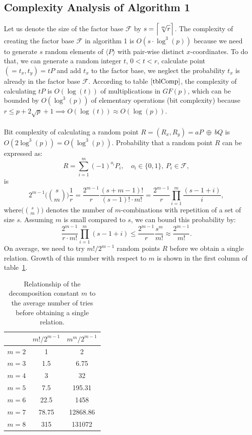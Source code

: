 \documentclass[thesis=M,english]{FITthesis}[2012/10/20]
\theoremstyle{remark}
\theoremstyle{definition}
\begin{document}
\subsection{Complexity Analysis of Algorithm 1}
Let us denote the size of the factor base $\mathcal{F}$ by $s = \mathlarger{\Big\lceil \sqrt[m]{r} \Big\rceil}$. The complexity of creating the factor base $\mathcal{F}$ in algorithm 1 is $O(s\cdot \log^3(p))$ because we need to generate $s$ random elements of $\langle P \rangle$ with pair-wise distinct $x$-coordinates. To do that, we can generate a random integer $t$, $0 < t < r$, calculate point $(=t_x, t_y) = tP$ and add $t_x$ to the factor base, we neglect the probability $t_x$ is already in the factor base $\mathcal{F}$. According to table $\ref{tblComp}$, the complexity of calculating $tP$ is $O(\log(t))$ of multiplications in $GF(p)$, which can be bounded by $O(\log^3(p))$ of elementary operations (bit complexity) because $r \leq p + 2\sqrt{p} + 1 \implies O(\log(t)) \approx O(\log(p)).$ \\
\\
\noindent Bit complexity of calculating a random point $R = (R_x, R_y) = aP\ \oplus\ bQ$ is $O(2\log^3(p)) = O(\log^3(p))$. Probability that a random point $R$ can be expressed as:
$$
R = \sum_{i=1}^m(-1)^{o_i}P_i,\quad o_i \in \{0,1\},\ P_i \in \mathcal{F},
$$
is 
$$
2^{m-1}\Bigg(\binom{s}{m}\Bigg)\frac{1}{r} = \frac{2^{m-1}}{r}\frac{(s + m -1)!}{(s-1)!\cdot m!}=\frac{2^{m-1}}{r} \prod_{i=1}^m\frac{(s-1+i)}{i},
$$
where$ \big(\binom{s}{m}\big)$ denotes the number of $m$-combinations with repetition of a set of size $s$. Assuming $m$ is small compared to $s$, we can bound this probability by:
$$
\frac{2^{m-1}}{r\cdot m!} \prod_{i=1}^m(s - 1+i) \leq \frac{2^{m-1}}{r}\frac{s^m}{m!} \approx \frac{2^{m-1}}{m!}.
$$
On average, we need to try $m! / 2^{m-1}$ random points $R$ before we obtain a single relation. Growth of this number with respect to $m$ is shown in the first column of table~\ref{growth}.
\begin{table}[H]
\centering
\begin{tabular}{ |c||c|c| } 
 \hline
 & $m!/2^{m-1}$ & $m^m/2^{m-1}$ \\ 
 \hline
 \hline
$m=2$ & 1& 2\\  \hline
$m=3$ & 1.5 & 6.75\\  \hline
$m=4$ &  3 & 32\\  \hline
$m=5$& 7.5 & 195.31\\ \hline
$m=6$& 22.5 & 1458 \\ \hline
$m=7$& 78.75 & 12868.86  \\ \hline
$m=8$& 315 & 131072  \\ \hline
\end{tabular}
\caption[Decomposition constant $m$ and the average number of tries]{Relationship of the decomposition constant $m$ to the average number of tries before obtaining a single relation.}
\label{growth}
\end{table}
\end{document}
